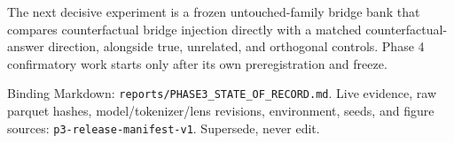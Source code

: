 \documentclass[10pt]{article}
\begin{document}
The next decisive experiment is a frozen untouched-family bridge bank
that compares counterfactual bridge injection directly with a matched
counterfactual-answer direction, alongside true, unrelated, and
orthogonal controls. Phase 4 confirmatory work starts only after its own
preregistration and freeze.

\vfill
\noindent\textcolor{muted}{\footnotesize
Binding Markdown: \texttt{reports/PHASE3\_STATE\_OF\_RECORD.md}. Live
evidence, raw parquet hashes, model/tokenizer/lens revisions, environment,
seeds, and figure sources: \texttt{p3-release-manifest-v1}. Supersede,
never edit.}
\end{document}
